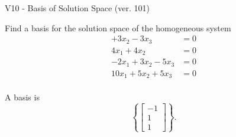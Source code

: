 \begin{exercise}
  \begin{exerciseTitle}V10 - Basis of Solution Space (ver. 101)\end{exerciseTitle}
  \begin{exerciseStatement}
    Find a basis for the solution space of the homogeneous system 
\begin{align*}
 + 3 x_ 2 -3 x_ 3 &= 0  \\ 
  4 x_ 1 + 4 x_ 2 &= 0  \\ 
  -2 x_ 1 + 3 x_ 2 -5 x_ 3 &= 0  \\ 
  10 x_ 1 + 5 x_ 2 + 5 x_ 3 &= 0  \\ 
 \end{align*}


 
  \end{exerciseStatement}

  \begin{exerciseAnswer}
   A basis is   
\[\left\{\left[\begin{array}{c}
-1 \\
1 \\
1
\end{array}\right]\right\}.\]

  


  \end{exerciseAnswer}
\end{exercise}